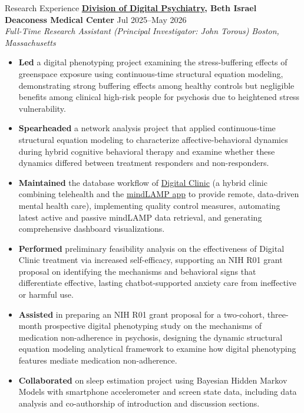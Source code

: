 \documentclass{resume} %
\begin{document}
\begin{rSection}{Research Experience}
\textbf{\href{https://www.digitalpsych.org/}{Division of Digital Psychiatry}, Beth Israel Deaconess Medical Center} \hfill{Jul 2025--May 2026} \\
\textit{Full-Time Research Assistant (Principal Investigator: John Torous)} \hfill{\textit{Boston, Massachusetts}}
 \begin{itemize}
    \itemsep -5pt {}
     \item \textbf{Led} a digital phenotyping project examining the stress-buffering effects of greenspace exposure using continuous-time structural equation modeling, demonstrating strong buffering effects among healthy controls but negligible benefits among clinical high-risk people for psychosis due to heightened stress vulnerability.
     \item \textbf{Spearheaded} a network analysis project that applied continuous-time structural equation modeling to characterize affective-behavioral dynamics during hybrid cognitive behavioral therapy and examine whether these dynamics differed between treatment responders and non-responders.
     \item \textbf{Maintained} the database workflow of \href{https://www.digitalpsych.org/digital-clinic1.html}{Digital Clinic} (a hybrid clinic combining telehealth and the \href{https://docs.lamp.digital/}{mindLAMP app} to provide remote, data-driven mental health care), implementing quality control measures, automating latest active and passive mindLAMP data retrieval, and generating comprehensive dashboard visualizations.
     \item \textbf{Performed} preliminary feasibility analysis on the effectiveness of Digital Clinic treatment via increased self-efficacy, supporting an NIH R01 grant proposal on    identifying the mechanisms and behavioral signs that differentiate effective, lasting chatbot-supported anxiety care from ineffective or harmful use. 
     \item \textbf{Assisted} in preparing an NIH R01 grant proposal for a two-cohort, three-month prospective digital phenotyping study on the mechanisms of medication non-adherence in psychosis, designing the dynamic structural equation modeling analytical framework to examine how digital phenotyping features mediate medication non-adherence.  
     \item \textbf{Collaborated} on sleep estimation project using Bayesian Hidden Markov Models with smartphone accelerometer and screen state data, including data analysis and co-authorship of introduction and discussion sections.
 \end{itemize}


\end{rSection}
\end{document}
